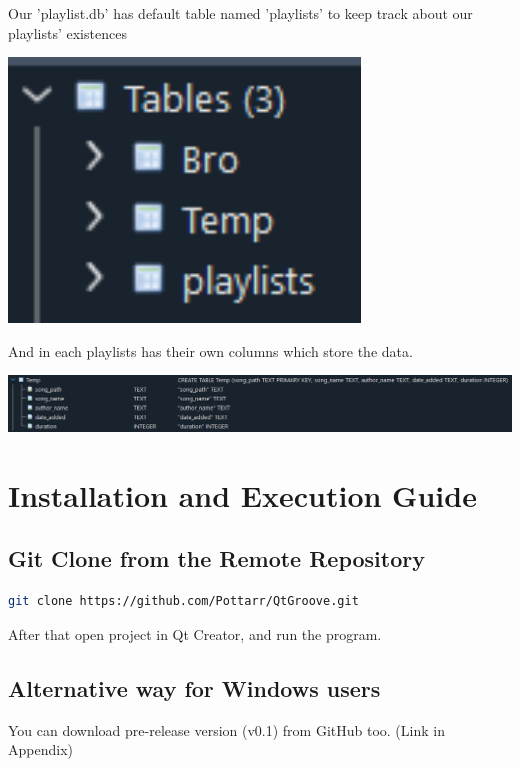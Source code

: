 \documentclass[12pt]{report} %
\begin{document}
Our 'playlist.db' has default table named 'playlists' to keep track about our playlists'
existences

\includegraphics[width=0.7\textwidth]{images/tables.png} %

And in each playlists has their own columns which store the data.

\includegraphics[height=0.1\textwidth]{images/cols.png} %

\newpage

\chapter{Installation and Execution Guide}
\section{Git Clone from the Remote Repository}
\begin{lstlisting}[language=Bash ,basicstyle=\footnotesize\ttfamily]
git clone https://github.com/Pottarr/QtGroove.git
\end{lstlisting}

After that open project in Qt Creator, and run the program.

\section{Alternative way for Windows users}

\hspace{1cm}You can download pre-release version (v0.1) from GitHub too.
(Link in Appendix)
\end{document}

